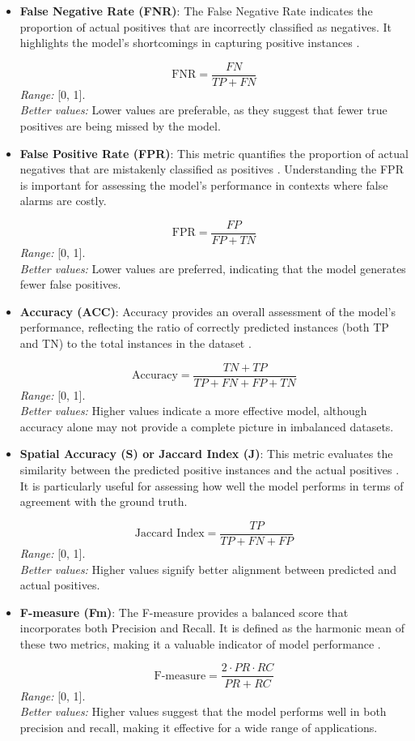 \documentclass{article}
\begin{document}
\begin{itemize}
	\item \textbf{False Negative Rate (FNR)}: The False Negative Rate indicates the proportion of actual positives that are incorrectly classified as negatives. It highlights the model's shortcomings in capturing positive instances \cite{powers2011evaluation}.
	
	\[
	\text{FNR} = \frac{FN}{TP + FN}
	\]
	\textit{Range:} [0, 1]. \\
	\textit{Better values:} Lower values are preferable, as they suggest that fewer true positives are being missed by the model.
	
	\item \textbf{False Positive Rate (FPR)}: This metric quantifies the proportion of actual negatives that are mistakenly classified as positives \cite{sokolova2009systematic}. Understanding the FPR is important for assessing the model's performance in contexts where false alarms are costly.
	
	\[
	\text{FPR} = \frac{FP}{FP + TN}
	\]
	\textit{Range:} [0, 1]. \\
	\textit{Better values:} Lower values are preferred, indicating that the model generates fewer false positives.
	
	\item \textbf{Accuracy (ACC)}: Accuracy provides an overall assessment of the model's performance, reflecting the ratio of correctly predicted instances (both TP and TN) to the total instances in the dataset \cite{powers2011evaluation}.
	
	\[
	\text{Accuracy} = \frac{TN + TP}{TP + FN + FP + TN}
	\]
	\textit{Range:} [0, 1]. \\
	\textit{Better values:} Higher values indicate a more effective model, although accuracy alone may not provide a complete picture in imbalanced datasets.
	
	\item \textbf{Spatial Accuracy (S) or Jaccard Index (J)}: This metric evaluates the similarity between the predicted positive instances and the actual positives \cite{sokolova2009systematic}. It is particularly useful for assessing how well the model performs in terms of agreement with the ground truth.
	
	\[
	\text{Jaccard Index} = \frac{TP}{TP + FN + FP}
	\]
	\textit{Range:} [0, 1]. \\
	\textit{Better values:} Higher values signify better alignment between predicted and actual positives.
	
	\item \textbf{F-measure (Fm)}: The F-measure provides a balanced score that incorporates both Precision and Recall. It is defined as the harmonic mean of these two metrics, making it a valuable indicator of model performance \cite{powers2011evaluation}.
	
	\[
	\text{F-measure} = \frac{2 \cdot PR \cdot RC}{PR + RC}
	\]
	\textit{Range:} [0, 1]. \\
	\textit{Better values:} Higher values suggest that the model performs well in both precision and recall, making it effective for a wide range of applications.
\end{itemize}
\end{document}
